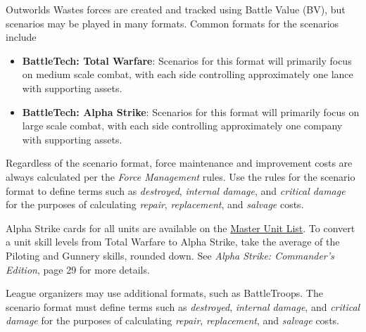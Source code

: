 Outworlds Wastes forces are created and tracked using Battle Value (BV), but scenarios may be played in many formats.
Common formats for the scenarios include

\begin{itemize}

\item {\bfseries BattleTech: Total Warfare}: Scenarios for this format will primarily focus on medium scale combat, with each side controlling approximately one lance with supporting assets.

\item {\bfseries BattleTech: Alpha Strike}: Scenarios for this format will primarily focus on large scale combat, with each side controlling approximately one company with supporting assets.

\end{itemize}

Regardless of the scenario format, force maintenance and improvement costs are always calculated per the \emph{Force Management} rules.
Use the rules for the scenario format to define terms such as \emph{destroyed}, \emph{internal damage}, and \emph{critical damage} for the purposes of calculating \emph{repair}, \emph{replacement}, and \emph{salvage} costs.

Alpha Strike cards for all units are available on the \href{http://www.masterunitlist.info}{Master Unit List}.
To convert a unit skill levels from Total Warfare to Alpha Strike, take the average of the Piloting and Gunnery skills, rounded down.
See \emph{Alpha Strike: Commander's Edition}, page 29 for more details.

League organizers may use additional formats, such as BattleTroops.
The scenario format must define terms such as \emph{destroyed}, \emph{internal damage}, and \emph{critical damage} for the purposes of calculating \emph{repair}, \emph{replacement}, and \emph{salvage} costs.
